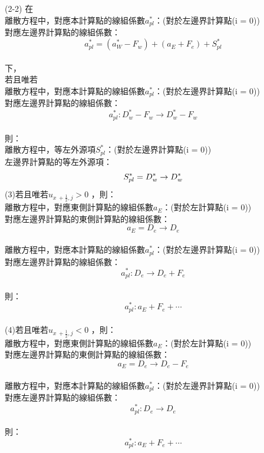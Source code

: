 \documentclass[12pt]{article}
\begin{document}
\noindent (2-2)
        在\\
        離散方程中，對應本計算點的線組係數$a_{pl}^{*}$：(對於左邊界計算點(i = 0))\\    
        對應左邊界計算點的線組係數：\\
        $$a_{pl}^{*} = (a_{W}^{*}-F_{w}) + (a_{E} + F_{e}) + S_{pl}^{*}$$\\
        下，\\
        若且唯若\\
        離散方程中，對應本計算點的線組係數$a_{pl}^{*}$：(對於左邊界計算點(i = 0))\\
        對應左邊界計算點的線組係數：\\
        $$a_{pl}^{*} : D_{w}^{*} - F_{w} \rightarrow D_{w}^{*} - F_{w}$$\\
        則：\\
        離散方程中，等左外源項$S_{pl}^{*}$：(對於左邊界計算點(i = 0))\\
        左邊界計算點的等左外源項：\\
        \begin{equation}
        S_{pl}^{*} = D_{w}^{*} \rightarrow D_{w}^{*}\\
        \end{equation}
\noindent (3)若且唯若$u_{x\ +\frac{1}{2} ,j} > 0$ ，則：\\
離散方程中，對應東側計算點的線組係數$a_{E}$：(對於左計算點(i = 0))\\
對應左邊界計算點的東側計算點的線組係數：\\
$$a_{E} = D_{e} \rightarrow D_{e}$$\\
離散方程中，對應本計算點的線組係數$a_{pl}^{*}$：(對於左邊界計算點(i = 0))\\
對應左邊界計算點的線組係數：\\
$$a_{pl}^{*} : D_{e} \rightarrow D_{e} + F_{e}$$\\
\noindent 則：\\
\begin{equation}a_{pl}^{*} : a_{E} + F_{e} +\cdots\end{equation}\\


\noindent (4)若且唯若$u_{x\ +\frac{1}{2} ,j} < 0$ ，則：\\
離散方程中，對應東側計算點的線組係數$a_{E}$：(對於左計算點(i = 0))\\
對應左邊界計算點的東側計算點的線組係數：\\
$$a_{E} = D_{e} \rightarrow D_{e} - F_{e}$$\\
離散方程中，對應本計算點的線組係數$a_{pl}^{*}$：(對於左邊界計算點(i = 0))\\
對應左邊界計算點的線組係數：\\
$$a_{pl}^{*} : D_{e} \rightarrow D_{e} $$\\
\noindent 則：\\
\begin{equation}a_{pl}^{*} : a_{E} + F_{e} +\cdots\end{equation}\\
\end{document}
